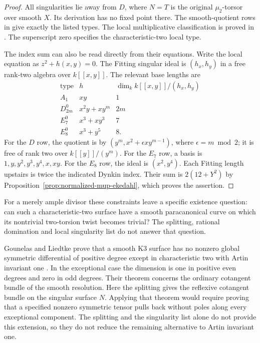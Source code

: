 \begin{proof}
All singularities lie away from $D$, where $N=T$ is the original
$\mu_2$-torsor over smooth $X$. Its derivation has no fixed
point there. The smooth-quotient rows in
\cite[Theorem~3.3 and Table~2, author version pp.~10--11]{MatsumotoActions}
give exactly the listed types. The local multiplicative
classification is proved in
\cite[Proposition~4.8 and Table~3, pp.~13--15]{MatsumotoMuN}.
The superscript zero specifies the characteristic-two local type.

The index sum can also be read directly from their equations.
Write the local equation as $z^2+h(x,y)=0$. The Fitting
singular ideal is $(h_x,h_y)$ in a free rank-two algebra over
$k[[x,y]]$. The relevant base lengths are
\[
\begin{array}{c|c|c}
 \text{type}&h&\dim_k k[[x,y]]/(h_x,h_y)\\ \hline
 A_1&xy&1\\
 D_{2m}^{0}&x^2y+xy^m&2m\\
 E_7^{0}&x^3+xy^3&7\\
 E_8^{0}&x^3+y^5&8.
\end{array}
\]
For the $D$ row, the quotient is by
$(y^m,x^2+\epsilon xy^{m-1})$, where $\epsilon=m\bmod2$;
it is free of rank two over $k[[y]]/(y^m)$. For the $E_7$
row, a basis is $1,y,y^2,y^3,y^4,x,xy$. For the $E_8$
row, the ideal is $(x^2,y^4)$. Each Fitting length upstairs is
twice the indicated Dynkin index. Their sum is
$2(12+Y^2)$ by
Proposition~\ref{prop:normalized-mup-ekedahl}, which proves
the assertion.
\end{proof}

For a merely ample divisor these constraints leave a specific
existence question: can such
a characteristic-two surface have a smooth paracanonical curve
on which its nontrivial two-torsion twist becomes trivial? The
splitting, rational domination and local singularity list do not
answer that question.


Gounelas and Liedtke prove that a smooth K3 surface has no nonzero
global symmetric differential of positive degree except in
characteristic two with Artin invariant one
\cite[Theorem~1.1, p.~2]{GounelasLiedtkeSymmetric}.
In the exceptional case the dimension is one in positive even
degrees and zero in odd degrees. Their theorem concerns the
ordinary cotangent bundle of the smooth resolution. Here the
splitting gives the reflexive cotangent bundle on the singular
surface $N$. Applying that theorem would require proving that a
specified nonzero symmetric tensor pulls back without poles along
every exceptional component. The splitting and the singularity
list alone do not provide this extension, so they do not reduce
the remaining alternative to Artin invariant one.
